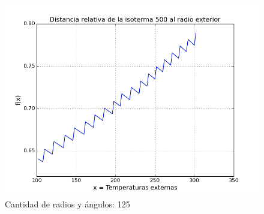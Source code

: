 \begin{figure}[h]
\centering

\includegraphics[scale=0.5]{experimentos1a_1b/evolucion_estimacion_seguridad_isoterma/variacion_125.png}

\caption{Cantidad de radios y ángulos: 125}
\end{figure}

